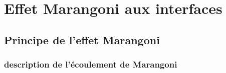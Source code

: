 \chapter{Effet Marangoni aux interfaces}\label{section:EffetMarangoniEtatArt}

\section{Principe de l'effet Marangoni}

\subsection{description de l'écoulement de Marangoni}
